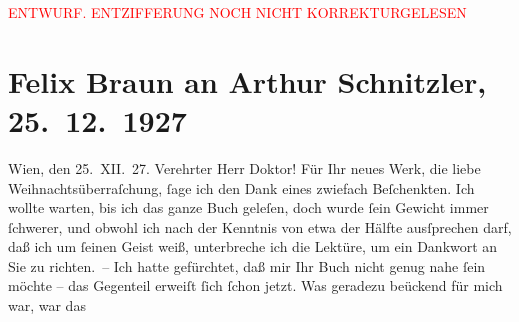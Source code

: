 
\begin{center}
            \textcolor{red}{ENTWURF. ENTZIFFERUNG NOCH NICHT KORREKTURGELESEN}
                      \end{center}
            
               \section[Felix Braun an Arthur Schnitzler, 25. 12. 1927]{ Felix Braun an Arthur Schnitzler, 25. 12. 1927}\nopagebreak{}\rehead{ }\begin{ledgroupsized}[t]{13cm}\normalsize\beginnumbering{} \toendnotes[C]{\smallbreak\pagebreak[2]} 
\toendnotes[C]{\smallbreak}\pstart
           \centering{}{\pb}Wien, den 25. XII. 27.\pend
           \pstart{}Verehrter Herr Doktor!\pend\pstart
           Für Ihr neues Werk, die liebe
               Weihnachtsüberraſchung, ſage ich den Dank eines zwiefach Beſchenkten. Ich wollte
               warten, bis ich das ganze Buch geleſen, doch wurde ſein Gewicht immer ſchwerer, und
               obwohl ich nach der Kenntnis von etwa der Hälfte ausſprechen darf, daß ich um ſeinen
               Geist weiß, unterbreche ich die Lektüre, um ein Dankwort an Sie zu richten. – \pend
           \pstart
           Ich hatte gefürchtet, daß mir Ihr Buch nicht genug \introOben{}nahe\introOben{} ſein
               möchte – das Gegenteil erweiſt ſich ſchon jetzt. Was geradezu beückend für {\pb}mich war, war das

\end{ledgroupsized}
